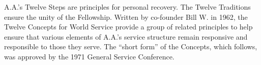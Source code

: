 



\begin{biblechapter}
    A.A.’s Twelve Steps are principles for personal recovery.
\verse The Twelve Traditions ensure the unity of the Fellowship.
\verse Written by co-founder Bill W. in 1962, 
    the Twelve Concepts for World Service 
    provide a group of related principles 
    to help ensure that various elements of A.A.’s service structure 
    remain responsive and responsible to those they serve.
The “short form” of the Concepts, which follows, was approved by the 1971 General Service Conference.
\end{biblechapter}


